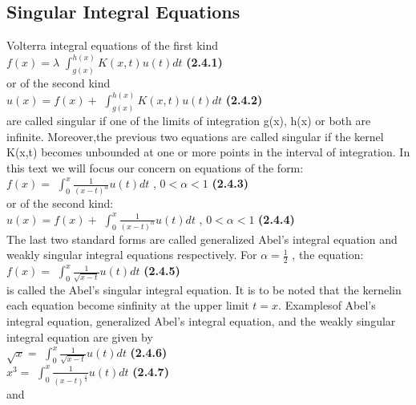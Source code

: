 \documentclass[12pt]{article}
\begin{document}
\newpage
\subsection{Singular Integral Equations}
Volterra integral equations of the first kind \\

$f(x) = \lambda$ \(\int_{g(x)}^{h(x)} K(x,t)u(t)dt\) \textbf{(2.4.1)}\\

or of the second kind\\

$u(x) = f(x) +$ \(\int_{g(x)}^{h(x)} K(x,t)u(t)dt\) \textbf{(2.4.2)}\\

are called singular if one of the limits of integration g(x), h(x) or both are inﬁnite. Moreover,the previous two equations are called singular if the kernel K(x,t) becomes unbounded at one or more points in the interval of integration. In this text we will focus our concern on equations of the form: \\

$f(x) =$ \(\int_{0}^{x} \frac{1}{(x - t)^ \alpha} u(t)dt\) ,    	$0 < \alpha < 1$ 		\textbf{(2.4.3)}\\

or of the second kind:\\

$u(x) = f(x) +$ \(\int_{0}^{x} \frac{1}{(x - t)^ \alpha} u(t)dt\) ,    	$0 < \alpha < 1$ 		\textbf{(2.4.4)}\\
The last two standard forms are called generalized Abel’s integral equation and weakly singular integral equations respectively. For $\alpha = \frac{1}{2}$ , the equation:\\

$f(x) =$ \(\int_{0}^{x} \frac{1}{\sqrt{x - t}} u(t)dt\)		\textbf{(2.4.5)}\\

is called the Abel’s singular integral equation. It is to be noted that the kernelin each equation become sinﬁnity at the upper limit $t = x$. Examplesof Abel’s integral equation, generalized Abel’s integral equation, and the weakly singular integral equation are given by\\

$\sqrt{x} =$ \(\int_{0}^{x} \frac{1}{\sqrt{x - t}} u(t)dt\)		\textbf{(2.4.6)}\\

$x^3 =$ \(\int_{0}^{x} \frac{1}{(x - t)^\frac{1}{3}} u(t)dt\)		\textbf{(2.4.7)}\\
and\\
\end{document}
